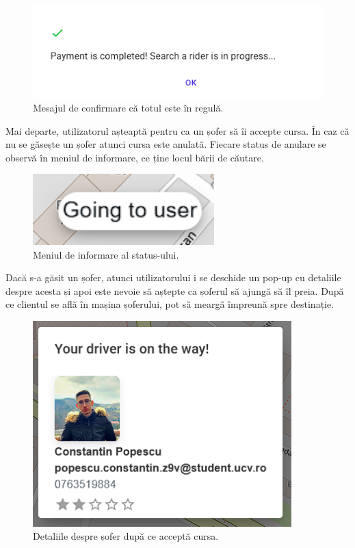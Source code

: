 \begin{figure}[H]
    \centering
    \includegraphics[width=14cm]{Assets/donePayment.png}
    \caption{Mesajul de confirmare că totul este în regulă.}
    \label{fig:paymentStep3}
\end{figure}

Mai departe, utilizatorul așteaptă pentru ca un șofer să îi accepte cursa. În caz că nu se găsește un șofer atunci cursa este anulată.
Fiecare status de anulare se observă în meniul de informare, ce ține locul bării de căutare.

\begin{figure}[H]
    \centering
    \includegraphics[width=7cm]{Assets/status.png}
    \caption{Meniul de informare al status-ului.}
    \label{fig:statusMenu}
\end{figure}

Dacă s-a găsit un șofer, atunci utilizatorului i se deschide un pop-up cu detaliile
despre acesta și apoi este nevoie să aștepte ca șoferul să ajungă să îl preia. După ce clientul se află în mașina șoferului, pot să meargă împreună spre 
destinație.

\begin{figure}[H]
    \centering
    \includegraphics[width=10cm]{Assets/driverDetails.png}
    \caption{Detaliile despre șofer după ce acceptă cursa.}
    \label{fig:driverDetails}
\end{figure}

